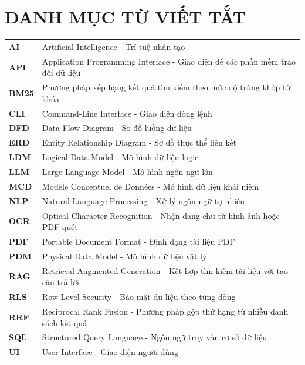 \documentclass[12pt,a4paper,oneside]{report}
\begin{document}
\clearpage
\chapter*{DANH MỤC TỪ VIẾT TẮT}
{\fontsize{12pt}{12pt}\selectfont{}
  \begin{longtable}{@{}L{3.0cm}L{12.1cm}@{}}
    \textbf{AI}   & Artificial Intelligence - Trí tuệ nhân tạo                                     \\
    \textbf{API}  & Application Programming Interface - Giao diện để các phần mềm trao đổi dữ liệu \\
    \textbf{BM25} & Phương pháp xếp hạng kết quả tìm kiếm theo mức độ trùng khớp từ khóa           \\
    \textbf{CLI}  & Command-Line Interface - Giao diện dòng lệnh                                   \\
    \textbf{DFD}  & Data Flow Diagram - Sơ đồ luồng dữ liệu                                        \\
    \textbf{ERD}  & Entity Relationship Diagram - Sơ đồ thực thể liên kết                          \\
    \textbf{LDM}  & Logical Data Model - Mô hình dữ liệu logic                                     \\
    \textbf{LLM}  & Large Language Model - Mô hình ngôn ngữ lớn                                    \\
    \textbf{MCD}  & Modèle Conceptuel de Données - Mô hình dữ liệu khái niệm                       \\
    \textbf{NLP}  & Natural Language Processing - Xử lý ngôn ngữ tự nhiên                          \\
    \textbf{OCR}  & Optical Character Recognition - Nhận dạng chữ từ hình ảnh hoặc PDF quét        \\
    \textbf{PDF}  & Portable Document Format - Định dạng tài liệu PDF                              \\
    \textbf{PDM}  & Physical Data Model - Mô hình dữ liệu vật lý                                   \\
    \textbf{RAG}  & Retrieval-Augmented Generation - Kết hợp tìm kiếm tài liệu với tạo câu trả lời \\
    \textbf{RLS}  & Row Level Security - Bảo mật dữ liệu theo từng dòng                            \\
    \textbf{RRF}  & Reciprocal Rank Fusion - Phương pháp gộp thứ hạng từ nhiều danh sách kết quả   \\
    \textbf{SQL}  & Structured Query Language - Ngôn ngữ truy vấn cơ sở dữ liệu                    \\
    \textbf{UI}   & User Interface - Giao diện người dùng                                          \\
  \end{longtable}}
\end{document}
